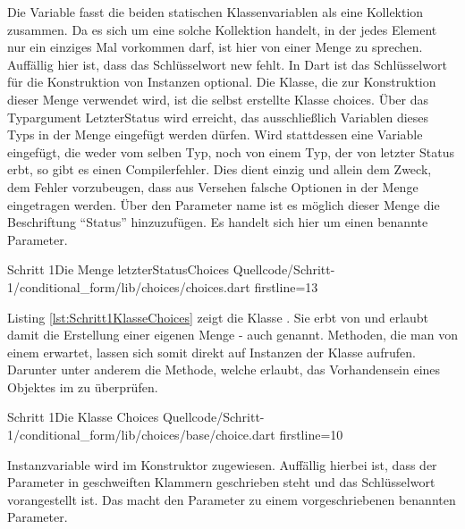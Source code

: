 Die Variable   fasst die beiden statischen Klassenvariablen als eine Kollektion zusammen.
Da es sich um eine solche Kollektion handelt, in der jedes Element nur ein einziges Mal vorkommen darf, ist hier von einer Menge zu sprechen.
Auffällig hier ist, dass das Schlüsselwort new fehlt.
In Dart ist das Schlüsselwort für die Konstruktion von Instanzen optional.
 Die Klasse, die zur Konstruktion dieser Menge verwendet wird, ist die selbst erstellte Klasse choices.
Über das Typargument LetzterStatus wird erreicht, das ausschließlich Variablen  dieses Typs in der Menge eingefügt werden dürfen.
Wird stattdessen eine Variable eingefügt, die weder vom selben Typ, noch von einem Typ, der von letzter Status erbt, so gibt es einen Compilerfehler.
Dies dient einzig und allein dem Zweck, dem  Fehler vorzubeugen, dass aus Versehen falsche Optionen in der Menge eingetragen werden.
Über den Parameter name ist es möglich dieser Menge die Beschriftung “Status” hinzuzufügen.
 Es handelt sich hier um einen  benannte Parameter.


\begin{alexlisting}{Schritt 1}{Die Menge letzterStatusChoices}
  {Quellcode/Schritt-1/conditional_form/lib/choices/choices.dart}
  {firstline=13}
  \label{lst:Schritt1DieMengeLetzterStatusChoices}
\end{alexlisting}

\clearpage

Listing \ref{lst:Schritt1KlasseChoices} zeigt die Klasse .
Sie erbt von  und erlaubt damit die Erstellung  einer eigenen Menge - auch  genannt.
Methoden, die man von einem  erwartet,  lassen sich somit direkt auf  Instanzen der Klasse  aufrufen.
Darunter unter anderem die  Methode,  welche erlaubt, das Vorhandensein eines Objektes im  zu überprüfen.

\begin{alexlisting}{Schritt 1}{Die Klasse Choices}
  {Quellcode/Schritt-1/conditional_form/lib/choices/base/choice.dart}
  {firstline=10}
  \label{lst:Schritt1KlasseChoices}
\end{alexlisting}

Instanzvariable   wird im Konstruktor  zugewiesen.
Auffällig hierbei ist, dass der Parameter in geschweiften Klammern geschrieben steht und das Schlüsselwort   vorangestellt ist.
Das macht den Parameter zu einem vorgeschriebenen benannten Parameter.

